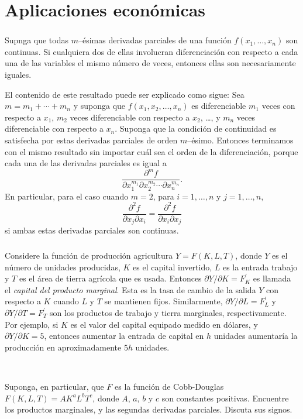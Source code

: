 \section{Aplicaciones económicas}

\begin{frame}[t]
\frametitle{\secname}

\begin{theorem}
Supnga que todas $m$--ésimas derivadas parciales de una función $f\left(x_{1},\ldots,x_{n}\right)$ son continuas. Si cualquiera dos de ellas involucran diferenciación con respecto a cada una de las variables el mismo número de veces, entonces ellas son necesariamente iguales.
\end{theorem}

El contenido de este resultado puede ser explicado como sigue: Sea $m=m_{1}+\cdots+m_{n}$ y suponga que $f\left(x_{1},x_{2},\ldots,x_{n}\right)$ es diferenciable $m_{1}$ veces con respecto a $x_{1}$, $m_{2}$ veces diferenciable con respecto a $x_{2}$, \ldots, y $m_{n}$ veces diferenciable con respecto a $x_{n}$. Suponga que la condición de continuidad es satisfecha por estas derivadas parciales de orden $m$--ésimo. Entonces terminamos con el mismo resultado sin importar cuál sea el orden de la diferenciación, porque cada una de las derivadas parciales es igual a \[ \frac{\partial^{m}f}{\partial x^{m_{1}}_{1}\partial x^{m_{2}}_{2}\cdots\partial x^{m_{n}}_{n}}. \] En particular, para el caso cuando $m=2$, para $i=1,\ldots,n$ y $j=1,\ldots,n$, \[ \frac{\partial^{2}f}{\partial x_{j}\partial x_{i}}=\frac{\partial^{2}f}{\partial x_{i}\partial x_{j}} \] si ambas estas derivadas parciales son continuas.
\end{frame}

\begin{frame}[t]
\frametitle{\secname}

\begin{example}
Considere la función de producción agricultura $Y=F\left(K,L,T\right)$, donde $Y$ es el número de unidades producidas, $K$ es el capital invertido, $L$ es la entrada trabajo y $T$ es el área de tierra agrícola que es usada. Entonces $\partial Y/\partial K=F^{\prime}_{K}$ es llamada el \emph{capital del producto marginal}. Esta es la tasa de cambio de la salida $Y$ con respecto a $K$ cuando $L$ y $T$ se mantienen fijos. Similarmente, $\partial Y/\partial L=F^{\prime}_{L}$ y $\partial Y/\partial T=F^{\prime}_{T}$ son los productos de trabajo y tierra marginales, respectivamente. Por ejemplo, si $K$ es el valor del capital equipado medido en dólares, y $\partial Y/\partial K=5$, entonces aumentar la entrada de capital en $h$ unidades aumentaría la producción en aproximadamente $5h$ unidades.

\

Suponga, en particular, que $F$ es la función de Cobb-Douglas $F\left(K,L,T\right)=AK^{a}L^{b}T^{c}$, donde $A$, $a$, $b$ y $c$ son constantes positivas. Encuentre los productos marginales, y las segundas derivadas parciales. Discuta sus signos.
\end{example}
\end{frame}

